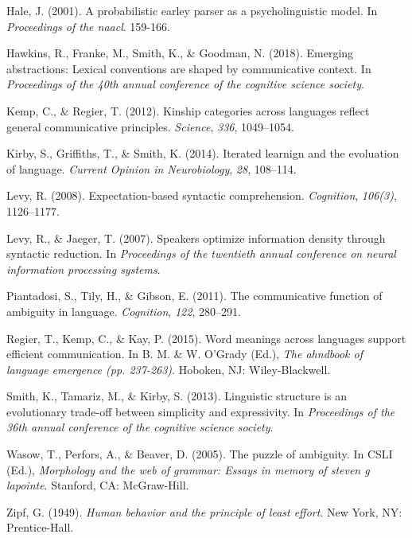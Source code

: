 \documentclass[10pt, letterpaper]{article}
\begin{document}
\hypertarget{ref-Hale2001a}{}
Hale, J. (2001). A probabilistic earley parser as a psycholinguistic
model. In \emph{Proceedings of the naacl}. 159-166.

\hypertarget{ref-HawkinsFrankeSmithGoodman2018a}{}
Hawkins, R., Franke, M., Smith, K., \& Goodman, N. (2018). Emerging
abstractions: Lexical conventions are shaped by communicative context.
In \emph{Proceedings of the 40th annual conference of the cognitive
science society}.

\hypertarget{ref-KempRegier2012a}{}
Kemp, C., \& Regier, T. (2012). Kinship categories across languages
reflect general communicative principles. \emph{Science}, \emph{336},
1049--1054.

\hypertarget{ref-KirbyGriffithsSmith2014a}{}
Kirby, S., Griffiths, T., \& Smith, K. (2014). Iterated learnign and the
evoluation of language. \emph{Current Opinion in Neurobiology},
\emph{28}, 108--114.

\hypertarget{ref-Levy2008a}{}
Levy, R. (2008). Expectation-based syntactic comprehension.
\emph{Cognition}, \emph{106(3)}, 1126--1177.

\hypertarget{ref-LevyJaeger2007a}{}
Levy, R., \& Jaeger, T. (2007). Speakers optimize information density
through syntactic reduction. In \emph{Proceedings of the twentieth
annual conference on neural information processing systems}.

\hypertarget{ref-Piantadosi2011a}{}
Piantadosi, S., Tily, H., \& Gibson, E. (2011). The communicative
function of ambiguity in language. \emph{Cognition}, \emph{122},
280--291.

\hypertarget{ref-RegierKempKay2015a}{}
Regier, T., Kemp, C., \& Kay, P. (2015). Word meanings across languages
support efficient communication. In B. M. \& W. O'Grady (Ed.), \emph{The
ahndbook of language emergence (pp. 237-263)}. Hoboken, NJ:
Wiley-Blackwell.

\hypertarget{ref-SmithTamarizKirby2013a}{}
Smith, K., Tamariz, M., \& Kirby, S. (2013). Linguistic structure is an
evolutionary trade-off between simplicity and expressivity. In
\emph{Proceedings of the 36th annual conference of the cognitive science
society}.

\hypertarget{ref-WasowPerforsBeaver2005a}{}
Wasow, T., Perfors, A., \& Beaver, D. (2005). The puzzle of ambiguity.
In CSLI (Ed.), \emph{Morphology and the web of grammar: Essays in memory
of steven g lapointe}. Stanford, CA: McGraw-Hill.

\hypertarget{ref-Zipf1949a}{}
Zipf, G. (1949). \emph{Human behavior and the principle of least
effort}. New York, NY: Prentice-Hall.


\end{document}
